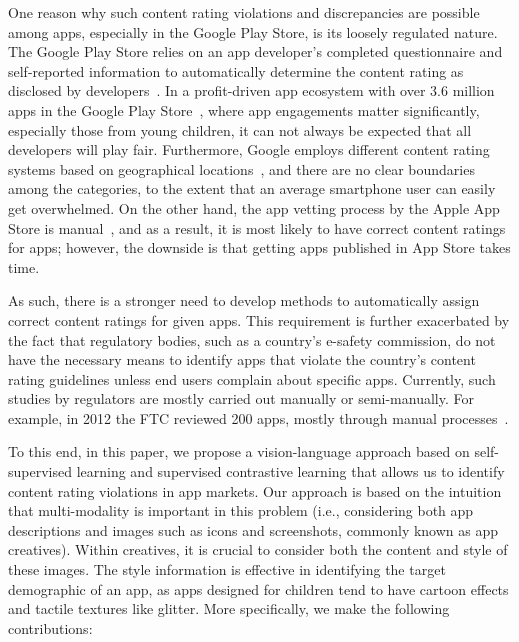 One reason why such content rating violations and discrepancies are possible among apps, especially in the Google Play Store, is its loosely regulated nature. The Google Play Store relies on an app developer's completed questionnaire and self-reported information to automatically determine the content rating as disclosed by developers~\cite{content_ratin_q_geographical}. In a profit-driven app ecosystem with over 3.6 million apps in the Google Play Store~\cite{avada}, where app engagements matter significantly, especially those from young children, it can not always be expected that all developers will play fair. Furthermore, Google employs different content rating systems based on geographical locations~\cite{content_ratin_q_geographical}, and there are no clear boundaries among the categories, to the extent that an average smartphone user can easily get overwhelmed. On the other hand, the app vetting process by the Apple App Store is manual~\cite{app_review_apple}, and as a result, it is most likely to have correct content ratings for apps; however, the downside is that getting apps published in App Store takes time.

As such, there is a stronger need to develop methods to automatically assign correct content ratings for given apps. This requirement is further exacerbated by the fact that regulatory bodies, such as a country's e-safety commission, do not have the necessary means to identify apps that violate the country's content rating guidelines unless end users complain about specific apps. Currently, such studies by regulators are mostly carried out manually or semi-manually. For example, in 2012 the FTC reviewed 200 apps, mostly through manual processes~\cite{federal2012mobile}.

To this end, in this paper, we propose a vision-language approach based on self-supervised learning and supervised contrastive learning that allows us to identify content rating violations in app markets. Our approach is based on the intuition that multi-modality is important in this problem (i.e., considering both app descriptions and images such as icons and screenshots, commonly known as app creatives). Within creatives, it is crucial to consider both the content and style of these images. The style information is effective in identifying the target demographic of an app, as apps designed for children tend to have cartoon effects and tactile textures like glitter. More specifically, we make the following contributions:


